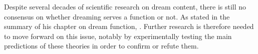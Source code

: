Despite several decades of scientific research on dream content, there is still no consensus on whether dreaming serves a function or not. As \citet{blagrove_distinguishing_2011} stated in the summary of his chapter on dream function, . Further research is therefore needed to move forward on this issue, notably by experimentally testing the main predictions of these theories in order to confirm or refute them.
